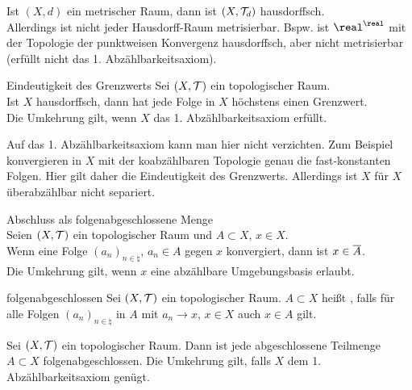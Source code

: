 \begin{Bsp}
    Ist $(X, d)$ ein metrischer Raum, dann ist $(X, \mathcal{T}_d)$ hausdorffsch. \\
    Allerdings ist nicht jeder Hausdorff-Raum metrisierbar.
    Bspw. ist $\real^\real$ mit der Topologie der punktweisen Konvergenz
    hausdorffsch, aber nicht metrisierbar
    (erfüllt nicht das 1. Abzählbarkeitsaxiom).
\end{Bsp}

\linie

\begin{Satz}{Eindeutigkeit des Grenzwerts}
    Sei $(X, \mathcal{T})$ ein topologischer Raum. \\
    Ist $X$ hausdorffsch,
    dann hat jede Folge in $X$ höchstens einen Grenzwert. \\
    Die Umkehrung gilt, wenn $X$ das 1. Abzählbarkeitsaxiom erfüllt.
\end{Satz}

\begin{Bem}
    Auf das 1. Abzählbarkeitsaxiom kann man hier nicht verzichten.
    Zum Beispiel konvergieren in $X$ mit der koabzählbaren Topologie genau die
    fast-konstanten Folgen.
    Hier gilt daher die Eindeutigkeit des Grenzwerts.
    Allerdings ist $X$ für $X$ überabzählbar nicht separiert.
\end{Bem}

\linie
\pagebreak

\begin{Satz}{Abschluss als folgenabgeschlossene Menge} \\
    Seien $(X, \mathcal{T})$ ein topologischer Raum und $A \subset X$, $x \in X$. \\
    Wenn eine Folge $(a_n)_{n \in \natural}$, $a_n \in A$ gegen $x$
    konvergiert, dann ist $x \in \overline{A}$. \\
    Die Umkehrung gilt, wenn $x$ eine abzählbare Umgebungsbasis erlaubt.
\end{Satz}

\begin{Def}{folgenabgeschlossen}
    Sei $(X, \mathcal{T})$ ein topologischer Raum.
    $A \subset X$ heißt , falls für alle Folgen
    $(a_n)_{n \in \natural}$ in $A$ mit $a_n \to x$, $x \in X$
    auch $x \in A$ gilt.
\end{Def}

\begin{Kor}
    Sei $(X, \mathcal{T})$ ein topologischer Raum.
    Dann ist jede abgeschlossene Teilmenge $A \subset X$ folgenabgeschlossen.
    Die Umkehrung gilt, falls $X$ dem 1. Abzählbarkeitsaxiom genügt.
\end{Kor}

